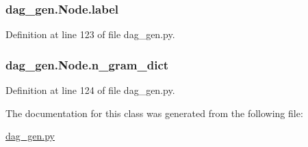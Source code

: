 \hypertarget{classdag__gen_1_1_node_a7288dbd5b48a2c69dcd9415c1566d3fe}{}
\subsubsection[{label}]{\setlength{\rightskip}{0pt plus 5cm}dag\+\_\+gen.\+Node.\+label}\label{classdag__gen_1_1_node_a7288dbd5b48a2c69dcd9415c1566d3fe}


Definition at line 123 of file dag\+\_\+gen.\+py.

\hypertarget{classdag__gen_1_1_node_ac9cef37d91d2466e146fcc75639a898d}{}
\subsubsection[{n\+\_\+gram\+\_\+dict}]{\setlength{\rightskip}{0pt plus 5cm}dag\+\_\+gen.\+Node.\+n\+\_\+gram\+\_\+dict}\label{classdag__gen_1_1_node_ac9cef37d91d2466e146fcc75639a898d}


Definition at line 124 of file dag\+\_\+gen.\+py.



The documentation for this class was generated from the following file\+:\begin{DoxyCompactItemize}
\item 
\hyperlink{dag__gen_8py}{dag\+\_\+gen.\+py}\end{DoxyCompactItemize}
